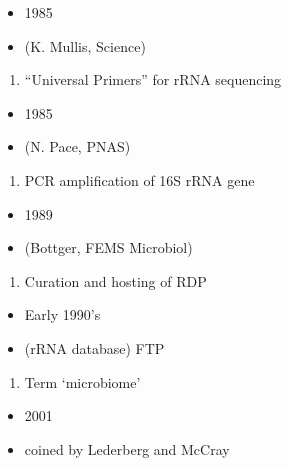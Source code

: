 \documentclass[
]{book}
\providecommand{\tightlist}{%
  \setlength{\itemsep}{0pt}\setlength{\parskip}{0pt}}
\begin{document}
\begin{itemize}
\tightlist
\item
  1985
\item
  (K. Mullis, Science)
\end{itemize}

\begin{enumerate}
\def\labelenumi{\arabic{enumi}.}
\setcounter{enumi}{2}
\tightlist
\item
  ``Universal Primers'' for rRNA sequencing
\end{enumerate}

\begin{itemize}
\tightlist
\item
  1985
\item
  (N. Pace, PNAS)
\end{itemize}

\begin{enumerate}
\def\labelenumi{\arabic{enumi}.}
\setcounter{enumi}{3}
\tightlist
\item
  PCR amplification of 16S rRNA gene
\end{enumerate}

\begin{itemize}
\tightlist
\item
  1989
\item
  (Bottger, FEMS Microbiol)
\end{itemize}

\begin{enumerate}
\def\labelenumi{\arabic{enumi}.}
\setcounter{enumi}{4}
\tightlist
\item
  Curation and hosting of RDP
\end{enumerate}

\begin{itemize}
\tightlist
\item
  Early 1990's
\item
  (rRNA database) FTP
\end{itemize}

\begin{enumerate}
\def\labelenumi{\arabic{enumi}.}
\setcounter{enumi}{5}
\tightlist
\item
  Term `microbiome'
\end{enumerate}

\begin{itemize}
\tightlist
\item
  2001
\item
  coined by Lederberg and McCray
\end{itemize}
\end{document}
